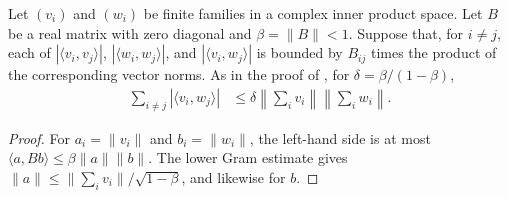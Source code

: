 \begin{lemma}
    \label{thm:ph_off_diagonal_pairing}
    \leanok
    Let $(v_i)$ and $(w_i)$ be finite families in a complex inner product space.
    Let $B$ be a real matrix with zero diagonal and $\beta=\lVert B\rVert<1$.
    Suppose that, for $i\ne j$, each of
    $|\langle v_i,v_j\rangle|$, $|\langle w_i,w_j\rangle|$, and
    $|\langle v_i,w_j\rangle|$ is bounded by $B_{ij}$ times the product
    of the corresponding vector norms. As in the proof of
    \cite[Lemma~6.1]{Nachtergaele1996Spectral}, for $\delta=\beta/(1-\beta)$,
    \begin{align}
        \sum_{i\ne j}|\langle v_i,w_j\rangle|
         & \leq\delta\left\lVert\sum_i v_i\right\rVert
        \left\lVert\sum_i w_i\right\rVert.
    \end{align}
\end{lemma}
\begin{proof}
    \leanok
    For $a_i=\lVert v_i\rVert$ and $b_i=\lVert w_i\rVert$, the left-hand side is
    at most $\langle a,Bb\rangle\leq\beta\lVert a\rVert\lVert b\rVert$.
    The lower Gram estimate gives
    $\lVert a\rVert\leq\lVert\sum_i v_i\rVert/\sqrt{1-\beta}$,
    and likewise for $b$.
\end{proof}


